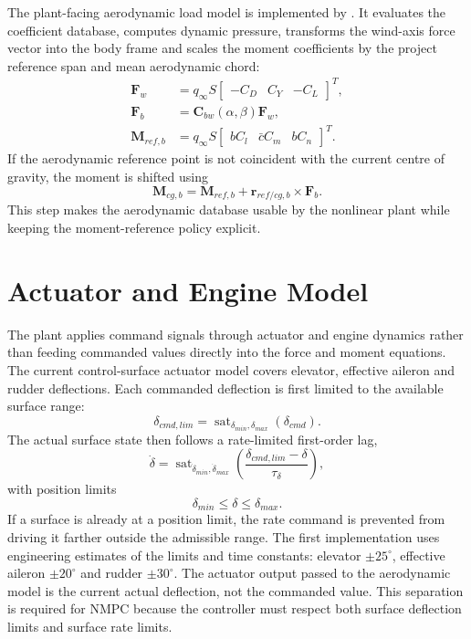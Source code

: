 The plant-facing aerodynamic load model is implemented by . It evaluates the coefficient database, computes dynamic pressure, transforms the wind-axis force vector into the body frame and scales the moment coefficients by the project reference span and mean aerodynamic chord:
\begin{align}
    \bm{F}_{w} &= q_{\infty} S
        \begin{bmatrix}
            -C_D & C_Y & -C_L
        \end{bmatrix}^{T}, \\
    \bm{F}_{b} &= \bm{C}_{bw}(\alpha,\beta)\bm{F}_{w}, \\
    \bm{M}_{ref,b} &= q_{\infty}S
        \begin{bmatrix}
            bC_l & \bar{c}C_m & bC_n
        \end{bmatrix}^{T}.
\end{align}
If the aerodynamic reference point is not coincident with the current centre of gravity, the moment is shifted using
\begin{equation}
    \bm{M}_{cg,b} =
    \bm{M}_{ref,b} + \bm{r}_{ref/cg,b} \times \bm{F}_{b}.
\end{equation}
This step makes the aerodynamic database usable by the nonlinear plant while keeping the moment-reference policy explicit.

\section{Actuator and Engine Model}

The plant applies command signals through actuator and engine dynamics rather
than feeding commanded values directly into the force and moment equations. The
current control-surface actuator model covers elevator, effective aileron and
rudder deflections. Each commanded deflection is first limited to the available
surface range:
\begin{equation}
    \delta_{cmd,lim} =
    \operatorname{sat}_{\delta_{min},\delta_{max}}
    \left(\delta_{cmd}\right).
\end{equation}
The actual surface state then follows a rate-limited first-order lag,
\begin{equation}
    \dot{\delta} =
    \operatorname{sat}_{\dot{\delta}_{min},\dot{\delta}_{max}}
    \left(\frac{\delta_{cmd,lim}-\delta}{\tau_{\delta}}\right),
\end{equation}
with position limits
\begin{equation}
    \delta_{min} \leq \delta \leq \delta_{max}.
\end{equation}
If a surface is already at a position limit, the rate command is prevented
from driving it farther outside the admissible range. The first implementation
uses engineering estimates of the limits and time constants: elevator
$\pm 25^\circ$, effective aileron $\pm 20^\circ$ and rudder $\pm 30^\circ$.
The actuator output passed to the aerodynamic model is the current actual
deflection, not the commanded value. This separation is required for NMPC
because the controller must respect both surface deflection limits and surface
rate limits.

